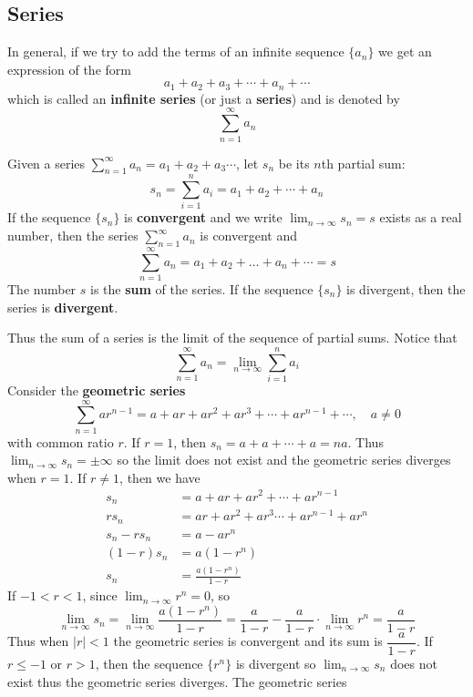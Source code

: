 \subsection{Series}

In general, if we try to add the terms of an infinite sequence \(\{a_n\}\) we
get an expression of the form
\[a_1+a_2+a_3+\cdots+a_n+\cdots\]
which is called an \textbf{infinite series} (or just a \textbf{series}) and is
denoted by
\[\sum_{n=1}^\infty a_n\]
\begin{definition}
    Given a series
    \(\displaystyle{\sum_{n=1}^{\infty}a_n=a_1+a_2+a_3\cdots}\), let \(s_n\)
    be its \(n\)th partial sum:
    \[s_n=\sum_{i=1}^n a_i=a_1+a_2+\cdots+a_n\]
    If the sequence \(\{s_n\}\) is \textbf{convergent} and we write
    \(\displaystyle{\lim_{n\to\infty}s_n=s}\) exists as a real number, then the
    series \(\displaystyle{\sum_{n=1}^\infty a_n}\) is convergent and
    \[\sum_{n=1}^{\infty}a_n=a_1+a_2+\dots+a_n+\cdots=s\]
    The number \(s\) is the \textbf{sum} of the series.
    If the sequence \(\{s_n\}\) is divergent, then the series is
    \textbf{divergent}.
\end{definition}
Thus the sum of a series is the limit of the sequence of partial sums.
Notice that
\[\sum_{n=1}^\infty a_n=\lim_{n\to\infty}\sum_{i=1}^n a_i\]
Consider the \textbf{geometric series}
\[\sum_{n=1}^\infty ar^{n-1}=a+ar+ar^2+ar^3+\cdots+ar^{n-1}+\cdots,
\quad a\neq 0\]
with common ratio \(r\).
If \(r=1\), then \(s_n=a+a+\cdots+a=na\).
Thus \(\displaystyle{\lim_{n\to\infty}s_n=\pm\infty}\) so the limit does not
exist and the geometric series diverges when \(r=1\).
If \(r\neq 1\), then we have
\begin{align*}
    s_n &= a+ar+ar^2+\cdots+ar^{n-1} \\
    rs_n &= ar+ar^2+ar^3\cdots+ar^{n-1}+ar^n \\
    s_n-rs_n &= a-ar^n \\
    (1-r)s_n &= a(1-r^n) \\
    s_n &= \frac{a(1-r^n)}{1-r}
\end{align*}
If \(-1<r<1\), since \(\displaystyle{\lim_{n\to\infty}r^n}=0\), so
\[\lim_{n\to\infty}s_n=\lim_{n\to\infty}\frac{a(1-r^n)}{1-r}
=\frac{a}{1-r}-\frac{a}{1-r}\cdot\lim_{n\to\infty}r^n=\frac{a}{1-r}\]
Thus when \(|r|<1\) the geometric series is convergent and its sum is
\(\dfrac{a}{1-r}\).
If \(r\leq -1\) or \(r>1\), then the sequence \(\{r^n\}\) is divergent so
\(\displaystyle{\lim_{n\to\infty}s_n}\) does not exist thus the geometric
series diverges.
The geometric series
